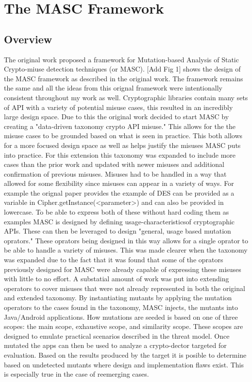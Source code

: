 \chapter{The MASC Framework}
\label{chap_framework}

\section{Overview}
\label{ch2:sec:overview}

The original work proposed a framework for Mutation-based Analysis of Static Crypto-miuse detection techniques (or MASC). [Add Fig 1] shows the design of the MASC framework as described in the original work. The framework remains the same and all the ideas from this orignal framework were intentionally consistent throughout my work as well. Cryptographic libraries contain many sets of API with a variety of potential misuse cases, this resulted in an incredibly large design space. Due to this the original work decided to start MASC by creating a "data-driven taxonomy crypto API misuse." This allows for the the misuse cases to be grounded based on what is seen in practice. This both allows for a more focused design space as well as helps justify the misuses MASC puts into practice. For this extension this taxonomy was expanded to include more cases than the prior work and updated with newer misuses and additional confirmation of previous misuses.
Misuses had to be handled in a way that allowed for some flexibility since misuses can appear in a variety of ways. For example the orignal paper provides the example of DES can be provided as a variable in Cipher.getInstance(<parameter>) and can also be provided in lowercase. To be able to express both of these without hard coding them as examples MASC is designed by defining usage-characteristicsof cryptographic APIs. These can then be leveraged to design "general, usage based mutation oprators." These oprators being designed in this way allows for a single oprator to be able to handle a variety of misuses. This was made clearer when the taxonomy was expanded due to the fact that it was found that some of the oprators previously designed for MASC were already capable of expressing these misuses with little to no effort. A substatial amount of work was put into extending operators to cover misuses that were not already represented in both the original and extended taxonomy.
By instantiating mutants by applying the mutation operators to the cases found in the taxonomy, MASC injects, the mutants into Java/Android applications. How mutations are seeded is based on one of three scopes: the main scope, exhaustive scope, and similarity scope. These scopes are designed to emulate practical scenarios described in the threat model. Once mutated the apps can then be used to analyze a crypto-dector targeted for evaluation. Based on the results produced by the target it is posible to determine based on undetected mutants where design and implementation flaws exist. This is especially true in the case of reemerging cases.

